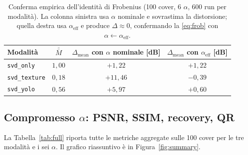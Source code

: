 \documentclass[11pt,a4paper]{article}
\theoremstyle{definition}
\theoremstyle{remark}
\begin{document}
\begin{table}[H]\centering
\begin{tabular}{lccc}
\toprule
\textbf{Modalit\`a} & $\overline{\bar M}$ & $\Delta_{\text{mean}}$ con $\alpha$ nominale [dB] & $\Delta_{\text{mean}}$ con $\alpha_{\text{eff}}$ [dB]\\
\midrule
\verb|svd_only|    & $1{,}00$ & $+1{,}22$  & $+1{,}22$ \\
\verb|svd_texture| & $0{,}18$ & $+11{,}46$ & $-0{,}39$ \\
\verb|svd_yolo|    & $0{,}56$ & $+5{,}97$  & $+0{,}60$ \\
\bottomrule
\end{tabular}
\caption{\label{tab:frob-id}Conferma empirica dell'identit\`a di
Frobenius (100 cover, 6 $\alpha$, 600 run per modalit\`a).  La
colonna sinistra usa $\alpha$ nominale e sovrastima la distorsione;
quella destra usa $\alpha_{\text{eff}}$ e produce $\Delta\approx 0$,
confermando la \eqref{eq:frob} con $\alpha\leftarrow\alpha_{\text{eff}}$.}
\end{table}

\subsection{Compromesso \texorpdfstring{$\alpha$}{alpha}: PSNR, SSIM, recovery, QR}

La Tabella~\ref{tab:full} riporta tutte le metriche aggregate sulle
100 cover per le tre modalit\`a e i sei $\alpha$.  Il grafico
riassuntivo \`e in Figura~\ref{fig:summary}.
\end{document}

